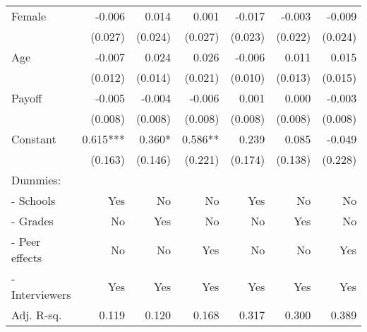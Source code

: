 \begin{table}[!h]
\begin{adjustbox}{width=1\textwidth}
\begin{threeparttable}
\begin{tabular}{l*{6}{D{.}{.}{-1}}}
Female              &              -0.006   &               0.014   &               0.001   &              -0.017   &              -0.003   &              -0.009   \\
                    &             (0.027)   &             (0.024)   &             (0.027)   &             (0.023)   &             (0.022)   &             (0.024)   \\
Age                 &              -0.007   &               0.024   &               0.026   &              -0.006   &               0.011   &               0.015   \\
                    &             (0.012)   &             (0.014)   &             (0.021)   &             (0.010)   &             (0.013)   &             (0.015)   \\
Payoff              &              -0.005   &              -0.004   &              -0.006   &               0.001   &               0.000   &              -0.003   \\
                    &             (0.008)   &             (0.008)   &             (0.008)   &             (0.008)   &             (0.008)   &             (0.008)   \\
Constant            &               0.615***&               0.360*  &               0.586** &               0.239   &               0.085   &              -0.049   \\
                    &             (0.163)   &             (0.146)   &             (0.221)   &             (0.174)   &             (0.138)   &             (0.228)   \\ \midrule
Dummies: &&&&& \\                    
- Schools             &                 Yes   &                  No   &                  No   &                 Yes   &                  No   &                  No   \\
- Grades              &                  No   &                 Yes   &                  No   &                  No   &                 Yes   &                  No   \\
- Peer effects        &                  No   &                  No   &                 Yes   &                  No   &                  No   &                 Yes   \\
- Interviewers        &                 Yes   &                 Yes   &                 Yes   &                 Yes   &                 Yes   &                 Yes   \\
\midrule
Adj. R-sq.          &               0.119   &               0.120   &               0.168   &               0.317   &               0.300   &               0.389   \\

\end{tabular}
\end{threeparttable}
\end{adjustbox}
\end{table}
